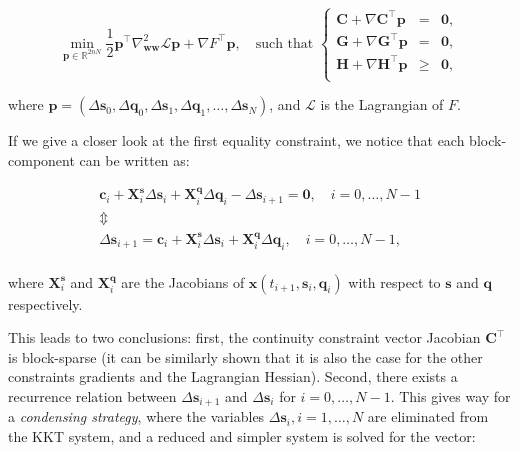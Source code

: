 \begin{equation}
  \min_{\mathbf{p}\in\mathbb R^{2nN}}
  \frac{1}{2}\mathbf{p}^\top\nabla^2_{\mathbf{w}\mathbf{w}}\mathcal{L}\mathbf{p} + \nabla
  F^\top\mathbf{p},
  \quad \text{such that }
  \left\{\begin{array}{rcl}
  \mathbf{C} + \nabla \mathbf{C}^\top\mathbf{p} &=& \mathbf{0},\\
  \mathbf{G} + \nabla \mathbf{G}^\top\mathbf{p} &=& \mathbf{0},\\
  \mathbf{H} + \nabla \mathbf{H}^\top\mathbf{p} &\ge& \mathbf{0},\\
  \end{array}\right.
\end{equation}

where $\mathbf{p}=
(\Delta\mathbf{s}_0,\Delta\mathbf{q}_0,\Delta\mathbf{s}_1,\Delta\mathbf{q}_1,\ldots,\Delta\mathbf{s}_N)$,
and $\mathcal{L}$ is the Lagrangian of $F$.

If we give a closer look at the first equality constraint, we notice
that each block-component can be written as:

\begin{equation}
\label{eq:chap3-ms-recurrence}
\begin{array}{c}
\mathbf{c}_i +
\mathbf{X}_i^\mathbf{s}\Delta\mathbf{s}_i +
\mathbf{X}_i^\mathbf{q}\Delta\mathbf{q}_i - \Delta\mathbf{s}_{i+1}=\mathbf{0}, \quad i=0,\ldots,N-1\\
\Updownarrow\\
\Delta\mathbf{s}_{i+1}=\mathbf{c}_i + \mathbf{X}_i^\mathbf{s}\Delta\mathbf{s}_i +
\mathbf{X}_i^\mathbf{q}\Delta\mathbf{q}_i, \quad i=0,\ldots,N-1,\\
\end{array}
\end{equation}

where $\mathbf{X}_i^\mathbf{s}$ and $\mathbf{X}_i^\mathbf{q}$ are the
Jacobians of $\mathbf{x}(t_{i+1},\mathbf{s}_i,\mathbf{q}_i)$ with
respect to $\mathbf{s}$ and $\mathbf{q}$ respectively.

This leads to two conclusions: first, the continuity constraint vector
Jacobian $\mathbf{C}^\top$ is block-sparse (it can be similarly shown
that it is also the case for the other constraints gradients and the
Lagrangian Hessian). Second, there exists a recurrence relation
between $\Delta\mathbf{s}_{i+1}$ and $\Delta\mathbf{s}_i$ for
$i=0,\ldots,N-1$. This gives way for a \emph{condensing strategy},
where the variables $\Delta\mathbf{s}_i, i=1,\ldots,N$ are eliminated
from the KKT system, and a reduced and simpler system is solved for
the vector:

